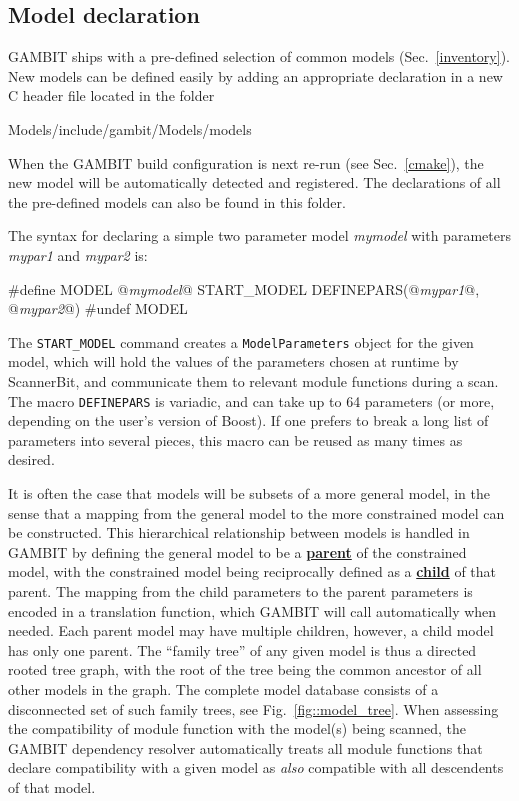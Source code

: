 \documentclass[pdftex,twocolumn,epjc3_preprint,runningheads]{svjour3}
\renewcommand{\_}{\discretionary{\underscore}{}{\underscore}}
\newcommand\cpp[1]{{\lstinline!#1!}}  %
\newcommand{\doublecross}[2]{\hyperref[#2]{\textbf{#1}}}
\newcommand{\metavarf}[1]{\textit{\color{darkgreen}\footnotesize\textrm{#1}}}
\newcommand{\metavar}{\metavarf}
\newcommand{\gambit}{\textsf{GAMBIT}\xspace}
\newcommand{\scannerbit}{\textsf{ScannerBit}\xspace}
\newcommand{\GB}{\gambit}
\newcommand\xx{\raisebox{0.2ex}{\smaller ++}\xspace}
\newcommand\Cpp{\textsf{C\xx}\xspace}
\begin{document}
\subsection{Model declaration} \label{model_declaration}
%
\GB ships with a pre-defined selection of common models (Sec.\ \ref{inventory}). New models can be defined easily by adding an appropriate declaration in a new \Cpp header file located in the folder
\begin{lstterm}
Models/include/gambit/Models/models
\end{lstterm}
When the \GB build configuration is next re-run (see Sec.\ \ref{cmake}), the new model will be automatically detected and registered.  The declarations of all the pre-defined models can also be found in this folder.

The syntax for declaring a simple two parameter model \metavar{my\_model} with parameters \metavar{my\_par1} and \metavar{my\_par2} is:
\begin{lstcpp}
#define MODEL @\metavar{my\_model}@
START_MODEL
DEFINEPARS(@\metavar{my\_par1}@, @\metavar{my\_par2}@)
#undef MODEL
\end{lstcpp}
The \cpp{START_MODEL} command creates a \cpp{ModelParameters} object for the given model, which will hold the values of the parameters chosen at runtime by \scannerbit, and communicate them to relevant module functions during a scan.  The macro \cpp{DEFINEPARS} is variadic, and can take up to 64 parameters (or more, depending on the user's version of \textsf{Boost}).  If one prefers to break a long list of parameters into several pieces, this macro can be reused as many times as desired.

It is often the case that models will be subsets of a more general model, in the sense that a mapping from the general model to the more constrained model can be constructed. This hierarchical relationship between models is handled in \GB by defining the general model to be a \doublecross{parent}{parent model} of the constrained model, with the constrained model being reciprocally defined as a \doublecross{child}{child model} of that parent. The mapping from the child parameters to the parent parameters is encoded in a translation function, which \GB will call automatically when needed. Each parent model may have multiple children, however, a child model has only one parent. The ``family tree'' of any given model is thus a directed rooted tree graph, with the root of the tree being the common ancestor of all other models in the graph. The complete model database consists of a disconnected set of such family trees, see Fig.\ \ref{fig::model_tree}. When assessing the compatibility of module function with the model(s) being scanned, the \GB dependency resolver automatically treats all module functions that declare compatibility with a given model as \textit{also} compatible with all descendents of that model.
\end{document}
